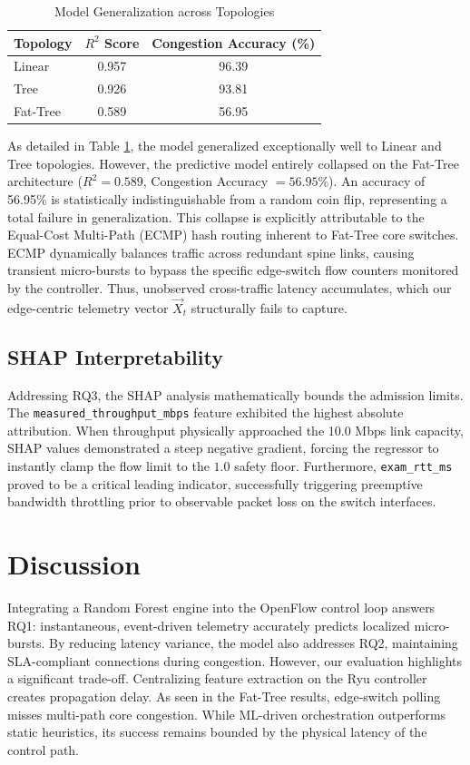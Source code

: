 \documentclass[journal]{IEEEtran}
\begin{document}
\begin{table}[htbp]
\centering
\caption{Model Generalization across Topologies}
\begin{tabular}{@{}lcc@{}}
\toprule
\textbf{Topology} & \textbf{$R^2$ Score} & \textbf{Congestion Accuracy (\%)} \\ \midrule
Linear & 0.957 & 96.39 \\
Tree & 0.926 & 93.81 \\
Fat-Tree & 0.589 & 56.95 \\ \bottomrule
\end{tabular}
\label{tab:topo}
\end{table}

As detailed in Table \ref{tab:topo}, the model generalized exceptionally well to Linear and Tree topologies. However, the predictive model entirely collapsed on the Fat-Tree architecture ($R^2 = 0.589$, Congestion Accuracy $= 56.95\%$). An accuracy of 56.95\% is statistically indistinguishable from a random coin flip, representing a total failure in generalization. This collapse is explicitly attributable to the Equal-Cost Multi-Path (ECMP) hash routing inherent to Fat-Tree core switches. ECMP dynamically balances traffic across redundant spine links, causing transient micro-bursts to bypass the specific edge-switch flow counters monitored by the controller. Thus, unobserved cross-traffic latency accumulates, which our edge-centric telemetry vector $\vec{X}_t$ structurally fails to capture.

\subsection{SHAP Interpretability}
Addressing RQ3, the SHAP analysis mathematically bounds the admission limits. The \texttt{measured\_throughput\_mbps} feature exhibited the highest absolute attribution. When throughput physically approached the 10.0 Mbps link capacity, SHAP values demonstrated a steep negative gradient, forcing the regressor to instantly clamp the flow limit to the $1.0$ safety floor. Furthermore, \texttt{exam\_rtt\_ms} proved to be a critical leading indicator, successfully triggering preemptive bandwidth throttling prior to observable packet loss on the switch interfaces.

\section{Discussion}
Integrating a Random Forest engine into the OpenFlow control loop answers RQ1: instantaneous, event-driven telemetry accurately predicts localized micro-bursts. By reducing latency variance, the model also addresses RQ2, maintaining SLA-compliant connections during congestion. However, our evaluation highlights a significant trade-off. Centralizing feature extraction on the Ryu controller creates propagation delay. As seen in the Fat-Tree results, edge-switch polling misses multi-path core congestion. While ML-driven orchestration outperforms static heuristics, its success remains bounded by the physical latency of the control path.
\end{document}
